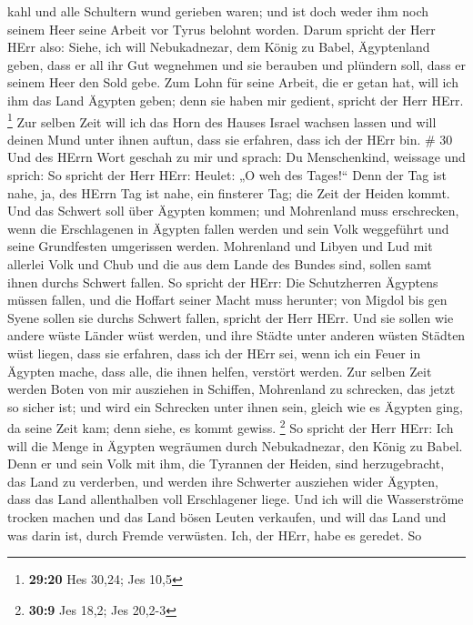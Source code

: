 kahl und alle Schultern wund gerieben waren; und ist doch weder ihm noch
seinem Heer seine Arbeit vor Tyrus belohnt worden.  Darum
spricht der Herr HErr also: Siehe, ich will Nebukadnezar, dem König zu
Babel, Ägyptenland geben, dass er all ihr Gut wegnehmen und sie berauben
und plündern soll, dass er seinem Heer den Sold gebe.  Zum
Lohn für seine Arbeit, die er getan hat, will ich ihm das Land Ägypten
geben; denn sie haben mir gedient, spricht der Herr HErr. \footnote{\textbf{29:20}
  Hes 30,24; Jes 10,5}  Zur selben Zeit will ich das Horn
des Hauses Israel wachsen lassen und will deinen Mund unter ihnen
auftun, dass sie erfahren, dass ich der HErr bin. \# 30  Und
des HErrn Wort geschah zu mir und sprach:  Du Menschenkind,
weissage und sprich: So spricht der Herr HErr: Heulet: „O weh des
Tages!{}``  Denn der Tag ist nahe, ja, des HErrn Tag ist
nahe, ein finsterer Tag; die Zeit der Heiden kommt.  Und das
Schwert soll über Ägypten kommen; und Mohrenland muss erschrecken, wenn
die Erschlagenen in Ägypten fallen werden und sein Volk weggeführt und
seine Grundfesten umgerissen werden.  Mohrenland und Libyen
und Lud mit allerlei Volk und Chub und die aus dem Lande des Bundes
sind, sollen samt ihnen durchs Schwert fallen.  So spricht
der HErr: Die Schutzherren Ägyptens müssen fallen, und die Hoffart
seiner Macht muss herunter; von Migdol bis gen Syene sollen sie durchs
Schwert fallen, spricht der Herr HErr.  Und sie sollen wie
andere wüste Länder wüst werden, und ihre Städte unter anderen wüsten
Städten wüst liegen,  dass sie erfahren, dass ich der HErr
sei, wenn ich ein Feuer in Ägypten mache, dass alle, die ihnen helfen,
verstört werden.  Zur selben Zeit werden Boten von mir
ausziehen in Schiffen, Mohrenland zu schrecken, das jetzt so sicher ist;
und wird ein Schrecken unter ihnen sein, gleich wie es Ägypten ging, da
seine Zeit kam; denn siehe, es kommt gewiss. \footnote{\textbf{30:9} Jes
  18,2; Jes 20,2-3}  So spricht der Herr HErr: Ich will die
Menge in Ägypten wegräumen durch Nebukadnezar, den König zu Babel.
 Denn er und sein Volk mit ihm, die Tyrannen der Heiden,
sind herzugebracht, das Land zu verderben, und werden ihre Schwerter
ausziehen wider Ägypten, dass das Land allenthalben voll Erschlagener
liege.  Und ich will die Wasserströme trocken machen und
das Land bösen Leuten verkaufen, und will das Land und was darin ist,
durch Fremde verwüsten. Ich, der HErr, habe es geredet.  So
